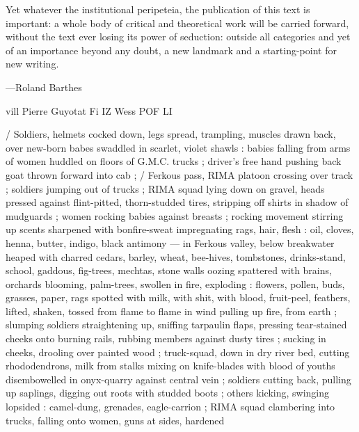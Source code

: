 Yet whatever the institutional peripeteia, the publication of
this text is important: a whole body of critical and theoretical work
will be carried forward, without the text ever losing its power of
seduction: outside all categories and yet of an importance beyond
any doubt, a new landmark and a starting-point for new writing.

—Roland Barthes

vill Pierre Guyotat
Fi IZ Wess POF LI

/ Soldiers, helmets cocked down, legs spread, trampling, muscles
drawn back, over new-born babes swaddled in scarlet, violet shawls
: babies falling from arms of women huddled on floors of G.M.C.
trucks ; driver's free hand pushing back goat thrown forward into cab
; / Ferkous pass, RIMA platoon crossing over track ; soldiers jumping
out of trucks ; RIMA squad lying down on gravel, heads pressed
against flint-pitted, thorn-studded tires, stripping off shirts in
shadow of mudguards ; women rocking babies against breasts ;
rocking movement stirring up scents sharpened with bonfire-sweat
impregnating rags, hair, flesh : oil, cloves, henna, butter, indigo,
black antimony — in Ferkous valley, below breakwater heaped with
charred cedars, barley, wheat, bee-hives, tombstones, drinks-stand,
school, gaddous, fig-trees, mechtas, stone walls oozing spattered
with brains, orchards blooming, palm-trees, swollen in fire, exploding
: flowers, pollen, buds, grasses, paper, rags spotted with milk, with
shit, with blood, fruit-peel, feathers, lifted, shaken, tossed from
flame to flame in wind pulling up fire, from earth ; slumping soldiers
straightening up, sniffing tarpaulin flaps, pressing tear-stained
cheeks onto burning rails, rubbing members against dusty tires ;
sucking in cheeks, drooling over painted wood ; truck-squad, down
in dry river bed, cutting rhododendrons, milk from stalks mixing on
knife-blades with blood of youths disembowelled in onyx-quarry
against central vein ; soldiers cutting back, pulling up saplings,
digging out roots with studded boots ; others kicking, swinging
lopsided : camel-dung, grenades, eagle-carrion ; RIMA squad
clambering into trucks, falling onto women, guns at sides, hardened

